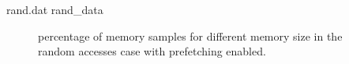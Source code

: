 \documentclass[10pt,a4paper]{article}
\begin{document}
\begin{filecontents}{rand.dat}
rand_data
\end{filecontents}

\begin{figure}[h]
  \caption{percentage of memory samples for different memory size in the random
    accesses case with prefetching enabled.}
\end{figure}
\end{document}
